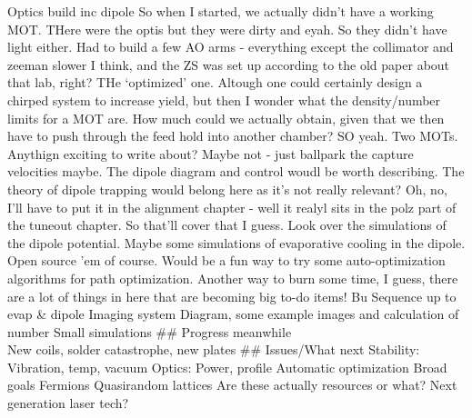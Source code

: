 Optics build inc dipole So when I started, we actually didn't have a
working MOT.
	THere were the optis but they were dirty and eyah.
	So they
didn't have light either.
	Had to build a few AO arms - everything except
the collimator and zeeman slower I think, and the ZS was set up
according to the old paper about that lab, right? THe `optimized' one.
Altough one could certainly design a chirped system to increase yield,
but then I wonder what the density/number limits for a MOT are.
	How much
could we actually obtain, given that we then have to push through the
feed hold into another chamber? SO yeah.
	Two MOTs.
	Anythign exciting to
write about? Maybe not - just ballpark the capture velocities maybe.
	The
dipole diagram and control woudl be worth describing.
	The theory of
dipole trapping would belong here as it's not really relevant? Oh, no,
I'll have to put it in the alignment chapter - well it realyl sits in
the polz part of the tuneout chapter.
	So that'll cover that I guess.
Look over the simulations of the dipole potential.
	Maybe some
simulations of evaporative cooling in the dipole.
	Open source 'em of
course.
	Would be a fun way to try some auto-optimization algorithms for
path optimization.
	Another way to burn some time, I guess, there are a
lot of things in here that are becoming big to-do items! Bu Sequence up
to evap \& dipole Imaging system Diagram, some example images and
calculation of number Small simulations \#\# Progress meanwhile\\
New coils, solder catastrophe, new plates \#\# Issues/What next
Stability: Vibration, temp, vacuum Optics: Power, profile Automatic
optimization Broad goals Fermions Quasirandom lattices Are these
actually resources or what? Next generation laser tech?

